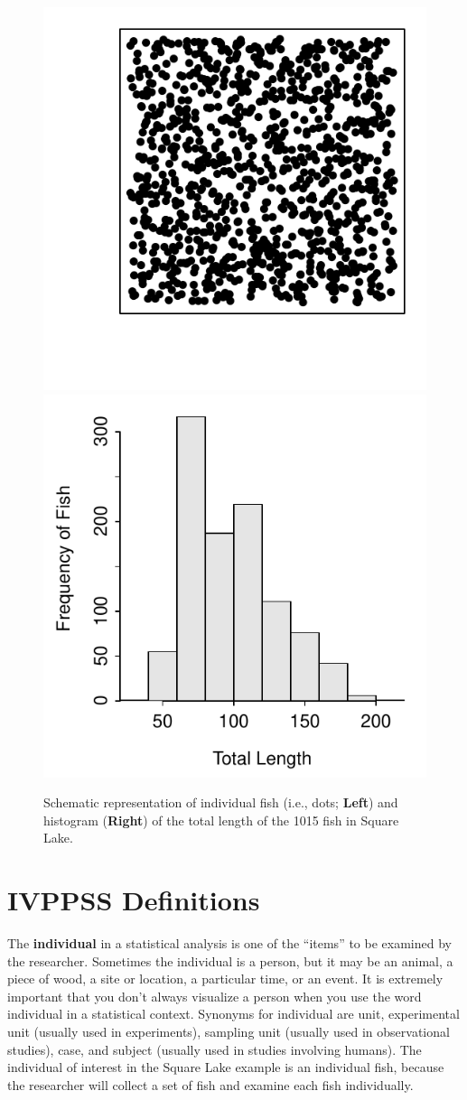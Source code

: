 \documentclass[10pt,openany]{book}\usepackage[]{graphicx}\usepackage[]{color}
\newenvironment{knitrout}{}{} %
\begin{document}
\begin{knitrout}
\color{fgcolor}\begin{figure}[hbtp]

{\centering \includegraphics[width=.4\linewidth]{Figs/SquareLakePopn-1} 
\includegraphics[width=.4\linewidth]{Figs/SquareLakePopn-2} 

}

\caption[Schematic representation of individual fish (i.e., dots]{Schematic representation of individual fish (i.e., dots; \textbf{Left}) and histogram (\textbf{Right}) of the total length of the 1015 fish in Square Lake.}\label{fig:SquareLakePopn}
\end{figure}


\end{knitrout}

\section{IVPPSS Definitions}
The \textbf{individual} in a statistical analysis is one of the ``items'' to be examined by the researcher.  Sometimes the individual is a person, but it may be an animal, a piece of wood, a site or location, a particular time, or an event.  It is extremely important that you don't always visualize a person when you use the word individual in a statistical context.  Synonyms for individual are unit, experimental unit (usually used in experiments), sampling unit (usually used in observational studies), case, and subject (usually used in studies involving humans).  The individual of interest in the Square Lake example is an individual fish, because the researcher will collect a set of fish and examine each fish individually.
\end{document}
